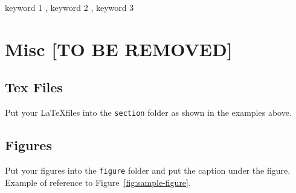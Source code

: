 \documentclass{ceurart}
\begin{document}
\begin{keywords}
  keyword 1 \sep
  keyword 2 \sep
  keyword 3 
\end{keywords}

\maketitle













\section{Misc [TO BE REMOVED]}

\subsection{Tex Files}

Put your \LaTeX files into the \texttt{section} folder as shown in the examples above.

\subsection{Figures}

Put your figures into the \texttt{figure} folder and put the caption under the figure. Example of reference to Figure~\ref{fig:sample-figure}.
\end{document}
